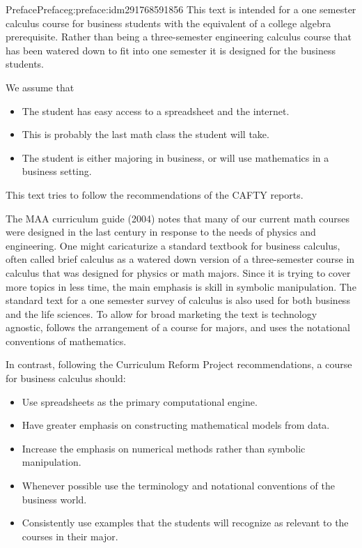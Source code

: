 \documentclass[oneside,10pt,]{book}
\numberwithin{equation}{section}
\begin{document}
\begin{preface}{Preface}{}{Preface}{}{}{g:preface:idm291768591856}
This text is intended for a one semester calculus course for business students with the equivalent of a college algebra prerequisite.  Rather than being a three-semester engineering calculus course that has been watered down to fit into one semester it is designed for the business students.%
\par
We assume that%
%
\begin{itemize}[label=\textbullet]
\item{}The student has easy access to a spreadsheet and the internet.%
\item{}This is probably the last math class the student will take.%
\item{}The student is either majoring in business, or will use mathematics in a business setting.%
\end{itemize}
This text tries to follow the recommendations of the CAFTY reports.%
\par
The MAA curriculum guide (2004) notes that many of our current math courses were designed in the last century in response to the needs of physics and engineering. One might caricaturize a standard textbook for business calculus, often called brief calculus as a watered down version of a three-semester course in calculus that was designed for physics or math majors. Since it is trying to cover more topics in less time, the main emphasis is skill in symbolic manipulation. The standard text for a one semester survey of calculus is also used for both business and the life sciences. To allow for broad marketing the text is technology agnostic, follows the arrangement of a course for majors, and uses the notational conventions of mathematics.%
\par
In contrast, following the Curriculum Reform Project recommendations, a course for business calculus should:%
%
\begin{itemize}[label=\textbullet]
\item{}Use spreadsheets as the primary computational engine.%
\item{}Have greater emphasis on constructing mathematical models from data.%
\item{}Increase the emphasis on numerical methods rather than symbolic manipulation.%
\item{}Whenever possible use the terminology and notational conventions of the business world.%
\item{}Consistently use examples that the students will recognize as relevant to the courses in their major.%

\end{itemize}
\end{preface}
\end{document}
